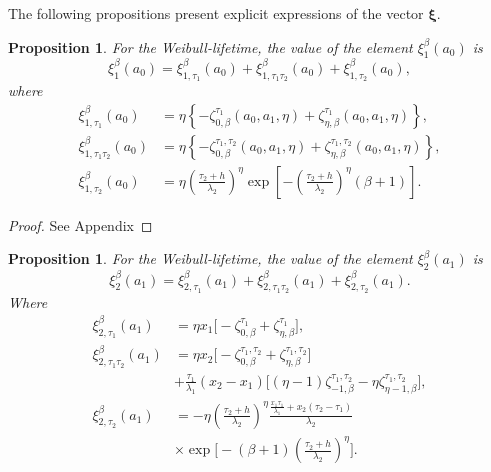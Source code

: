 \documentclass{article}
\newtheorem{proposition}[theorem]{Proposition}
\begin{document}
The following propositions present explicit expressions of the vector $\boldsymbol{\xi}.$
\begin{proposition}
For the Weibull-lifetime, the value of the element $\xi_{1}^{\beta}(a_0)$ is
\begin{equation*}
\xi_{1}^{\beta}(a_0)=\xi_{1,\tau_1}^{\beta}(a_0)+\xi_{1,\tau_1\tau_2}^{\beta}(a_0)+\xi_{1,\tau_2}^{\beta}(a_0),
\end{equation*}
where
\begin{align*}
\xi_{1,\tau_1}^{\beta}(a_0)&=\eta\left\{-\zeta_{0,\beta}^{\tau_1}(a_0,a_1,\eta)+\zeta_{\eta,\beta}^{\tau_1}(a_0,a_1,\eta)\right\},
\\
\xi_{1,\tau_1\tau_2}^{\beta}(a_0)&=\eta\left\{-\zeta_{0,\beta}^{\tau_1,\tau_2}(a_0,a_1,\eta)+\zeta_{\eta,\beta}^{\tau_1,\tau_2}(a_0,a_1,\eta)\right\},
\\
\xi_{1,\tau_2}^{\beta}(a_0)&=\eta \left(\frac{\tau_2+h}{\lambda_2}\right)^{\eta} \exp\left[-\left(\frac{\tau_2+h}{\lambda_2}\right)^{\eta}(\beta+1)\right].
\end{align*}
\end{proposition}
\begin{proof}
See Appendix
\end{proof}
\begin{proposition}
For the Weibull-lifetime, the value of the element $\xi_{2}^{\beta}(a_1)$ is
\begin{equation*}
\xi_{2}^{\beta}(a_1)=\xi_{2,\tau_1}^{\beta}(a_1)+\xi_{2,\tau_1\tau_2}^{\beta}(a_1)+\xi_{2,\tau_2}^{\beta}(a_1).
\end{equation*}
Where
\begin{equation}
\begin{aligned}
\xi_{2,\tau_1}^{\beta}(a_1)
&=\eta x_1
\Big[
-\zeta_{0,\beta}^{\tau_1}
+\zeta_{\eta,\beta}^{\tau_1}
\Big],
\\
\xi_{2,\tau_1\tau_2}^{\beta}(a_1)
&=
\eta x_2
\Big[
-\zeta_{0,\beta}^{\tau_1,\tau_2}
+\zeta_{\eta,\beta}^{\tau_1,\tau_2}
\Big]
\\
&
+\frac{\tau_1}{\lambda_1}(x_2-x_1)
\Big[
(\eta-1)\zeta_{-1,\beta}^{\tau_1,\tau_2}
-\eta\zeta_{\eta-1,\beta}^{\tau_1,\tau_2}
\Big],
\\
\xi_{2,\tau_2}^{\beta}(a_1)
&=
-\eta
\left(
\frac{\tau_2+h}{\lambda_2}
\right)^{\eta}
\frac{\frac{x_1\tau_1}{\lambda_1}
+x_2(\tau_2-\tau_1)}{\lambda_2}
\\
&\times
\exp\!\Bigg[
-(\beta+1)
\left(
\frac{\tau_2+h}{\lambda_2}
\right)^{\eta}
\Bigg].
\end{aligned}  \nonumber
\end{equation}

\end{proposition}
\end{document}
